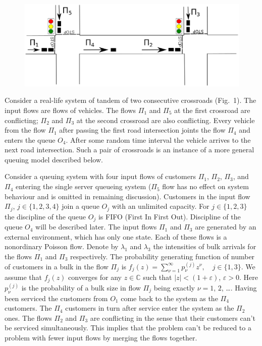 \begin{figure}[h]
  \centering
  \includegraphics[width=1\maxpicturewidth]{Crossroads.eps}
     \label{crossroads}
\end{figure}


Consider a real-life system of tandem of two consecutive crossroads
(Fig.~1).
The input flows are flows of vehicles. The flows $\Pi_1$ and $\Pi_5$ at the first crossroad are
conflicting; $\Pi_2$ and $\Pi_3$ at the second crossroad are also conflicting. Every vehicle from
the flow $\Pi_1$ after passing the first road intersection joints the flow $\Pi_4$ and enters the queue
$O_4$. After some random time interval the vehicle arrives to the next road intersection. Such a pair of crossroads is an instance of a more general queuing model described below. 

Consider a queuing system with  four input flows of customers $\Pi_1$, $\Pi_2$, $\Pi_3$, and $\Pi_4$ entering the single server queueing
system ($\Pi_5$ flow has no effect on system behaviour and is omitted in remaining discussion). Customers in the input flow $\Pi_j$, $j \in \{1,2,3,4\}$ join a queue $O_j$ with an
unlimited capacity. For $j \in \{1,2,3\}$ the discipline of the queue $O_j$ is FIFO (First In First
Out). Discipline of the queue $O_4$ will be described later. The input flows $\Pi_1$ and $\Pi_3$ are
generated by an external environment, which has only one state. Each of these flows is a nonordinary
Poisson flow. Denote by $\lambda_1$ and $\lambda_3$ the intensities of bulk arrivals for the flows
$\Pi_1$ and $\Pi_3$ respectively. The probability generating function of number of customers in a
bulk in the flow $\Pi_j$ is $f_j(z) = \sum_{\nu=1}^{\infty} p_{\nu}^{(j)} z ^{\nu}, \quad j\in \{1,3\}$.
We assume that $f_j(z)$ converges for any $z\in \mathbb{C}$ such that $|z|<(1+\varepsilon)$,
$\varepsilon>0$. Here $p_{\nu}^{(j)}$ is the probability of a bulk size in flow $\Pi_j$ being
exactly $\nu=1$, $2$, \ldots. Having been serviced the customers from $O_1$ come back to the system
as the $\Pi_4$ customers. The $\Pi_4$ customers in turn after service enter the system as the
$\Pi_2$ ones. The flows $\Pi_2$ and $\Pi_3$ are conflicting in the sense that their customers can't
be serviced simultaneously. This implies that the problem can't be reduced to a problem with fewer
input flows by merging the flows together.


